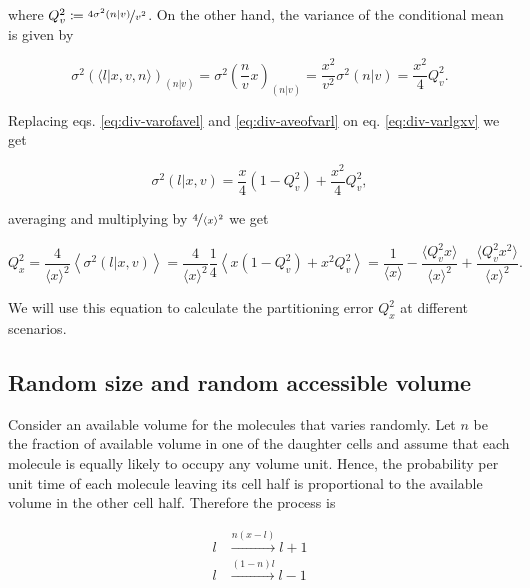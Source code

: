 where $Q_v^2 \coloneqq \nicefrac{4\sigma^2(n|v)}{v^2}$. On the other hand, the variance of the conditional mean is given by

\begin{equation}
  \label{eq:div-aveofvarl}
  \sigma^2\left(\langle l|x,v,n\rangle\right)_{(n|v)} = \sigma^2\left(\frac{n}{v}x\right)_{(n|v)} = \frac{x^2}{v^2}\sigma^2(n|v) = \frac{x^2}{4}Q_v^2.
\end{equation}

Replacing eqs. \eqref{eq:div-varofavel} and \eqref{eq:div-aveofvarl} on eq. \eqref{eq:div-varlgxv} we get

\begin{equation*}
  \sigma^2(l|x,v) = \frac{x}{4}(1-Q_v^2)+\frac{x^2}{4}Q_v^2,
\end{equation*}

averaging and multiplying by $\nicefrac{4}{\langle x\rangle^2}$ we get

\begin{equation}
  \label{eq:div-Qdis}
  Q_x^2 = \frac{4}{\langle x\rangle^2}\left\langle\sigma^2(l|x,v)\right\rangle = \frac{4}{\langle x\rangle^2}\frac{1}{4}\left\langle x(1-Q_v^2) + x^2Q_v^2 \right\rangle = \frac{1}{\langle x\rangle} - \frac{\langle Q_v^2x\rangle}{\langle x\rangle^2} + \frac{\langle Q_v^2x^2\rangle}{\langle x\rangle^2}.
\end{equation}

We will use this equation to calculate the partitioning error $Q_x^2$ at different scenarios.

\subsection{Random size and random accessible volume}

Consider an available volume for the molecules that varies randomly. Let $n$ be the fraction of available volume in one of the daughter cells and assume that each molecule is equally likely to occupy any volume unit. Hence, the probability per unit time of each molecule leaving its cell half is proportional to the available volume in the other cell half. Therefore the process is

\begin{equation}
  \begin{split}
    l&\xrightarrow{n(x-l)}l+1\\
    l&\xrightarrow{(1-n)l}l-1
  \end{split}
\end{equation}

